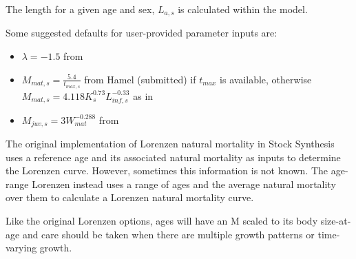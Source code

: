 The length for a given age and sex, $L_{a,s}$ is calculated within the model.

Some suggested defaults for user-provided parameter inputs are:
\begin{itemize}
 \item $\lambda = -1.5$ from \citet{gulland1987natural}
 \item $M_{mat,s}=\frac{5.4}{t_{max,s}}$ from Hamel (submitted) if $t_{max}$ is available, otherwise $M_{mat,s} = 4.118K_{s}^{0.73}L_{inf,s}^{-0.33}$ as in \citet{then2015evaluating} 
 \item $M_{juv,s} = 3W_{mat}^{-0.288}$ from \citet{lorenzen1996relationship}
\end{itemize}

The original implementation of Lorenzen natural mortality in Stock Synthesis uses a reference age and its associated natural mortality as inputs to determine the Lorenzen curve. However, sometimes this information is not known. The age-range Lorenzen instead uses a range of ages and the average natural mortality over them to calculate a Lorenzen natural mortality curve.

Like the original Lorenzen options, ages will have an M scaled to its body size-at-age and care should be taken when there are multiple growth patterns or time-varying growth.

